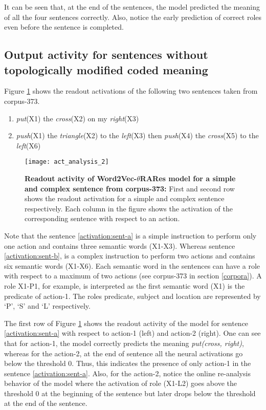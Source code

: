 It can be seen that, at the end of the sentences, the model predicted the meaning of all the four sentences correctly. Also, notice the early prediction of correct roles even before the sentence is completed.

\subsection{Output activity for sentences without topologically modified coded meaning} 

Figure \ref{fig:act_analysis_2} shows the readout activations of the following two sentences taken from corpus-373. 

\begin{enumerate}[noitemsep,label=(\Alph*) ]
\item \textit{put}(X1) the \textit{cross}(X2) on my \textit{right}(X3) \label{activation:sent-a}
\item \textit{push}(X1) the \textit{triangle}(X2) to the \textit{left}(X3) then \textit{push}(X4) the \textit{cross}(X5) to the \textit{left}(X6) \label{activation:sent-b}
\end{enumerate}

\begin{figure}[hbtp]
\centering
\texttt{[image: act\_analysis\_2]}
\caption[Readout activity of Word2Vec-$\theta$RARes model for a simple and complex sentence from corpus-373.]{\textbf{Readout activity of Word2Vec-$\theta$RARes model for a simple and complex sentence from corpus-373: }{\small First and second row shows the readout activation for a simple and complex sentence respectively. Each column in the figure shows the activation of the corresponding sentence with respect to an action.} }
\label{fig:act_analysis_2}
\end{figure}

Note that the sentence \ref{activation:sent-a} is a simple instruction to perform only one action and contains three semantic words (X1-X3). Whereas sentence \ref{activation:sent-b}, is a complex instruction to perform two actions and contains six semantic words (X1-X6). Each semantic word in the sentences can have a role with respect to a maximum of two actions (see corpus-373 in section \ref{corpora}). A role X1-P1, for example, is interpreted as the first semantic word (X1)  is the predicate of action-1. The roles predicate, subject and location are represented by `P', `S' and `L' respectively.

The first row of Figure \ref{fig:act_analysis_2} shows the readout activity of the model for sentence \ref{activation:sent-a} with respect to action-1 (left) and action-2 (right). One can see that for action-1, the model correctly predicts the meaning \textit{put(cross, right)}, whereas for the action-2, at the end of sentence all the neural activations go below the threshold 0. Thus, this indicates the presence of only action-1 in the sentence  \ref{activation:sent-a}. Also, for the action-2, notice the online re-analysis behavior of the model where the activation of role (X1-L2) goes above the threshold 0 at the beginning of the sentence but later drops below the threshold at the end of the sentence.

